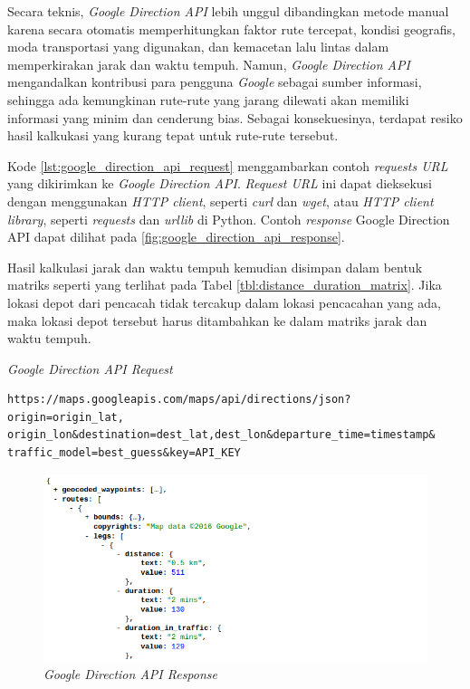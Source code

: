 Secara teknis, \textit{Google Direction API} lebih unggul dibandingkan metode manual karena secara otomatis memperhitungkan faktor rute tercepat, kondisi geografis, moda transportasi yang digunakan, dan kemacetan lalu lintas dalam memperkirakan jarak dan waktu tempuh. Namun, \textit{Google Direction API} mengandalkan kontribusi para pengguna \textit{Google} sebagai sumber informasi, sehingga ada kemungkinan rute-rute yang jarang dilewati akan memiliki informasi yang minim dan cenderung bias. Sebagai konsekuesinya, terdapat resiko hasil kalkukasi yang kurang tepat untuk rute-rute tersebut. 


Kode \ref{lst:google_direction_api_request} menggambarkan contoh \textit{requests URL} yang dikirimkan ke \textit{Google Direction API}. \textit{Request URL} ini dapat dieksekusi dengan menggunakan \textit{HTTP client}, seperti \textit{curl} dan \textit{wget}, atau \textit{HTTP client library}, seperti \textit{requests} dan \textit{urllib} di Python. Contoh \textit{response} Google Direction API dapat dilihat pada \autoref{fig:google_direction_api_response}.


Hasil kalkulasi jarak dan waktu tempuh kemudian disimpan dalam bentuk matriks seperti yang terlihat pada Tabel \ref{tbl:distance_duration_matrix}. Jika lokasi depot dari pencacah tidak tercakup dalam lokasi pencacahan yang ada, maka lokasi depot tersebut harus ditambahkan ke dalam matriks jarak dan waktu tempuh.


\begin{listing}[!]
	\caption{\textit{Google Direction API Request}}
	\label{lst:google_direction_api_request}
	\begin{verbatim}
https://maps.googleapis.com/maps/api/directions/json?origin=origin_lat,
origin_lon&destination=dest_lat,dest_lon&departure_time=timestamp&
traffic_model=best_guess&key=API_KEY
	\end{verbatim}
\end{listing}


\begin{figure}[!]
	\centering
	\includegraphics[width=\textwidth]{Resources/Images/google_direction_api_response}
	\caption{\textit{Google Direction API Response}}
	\label{fig:google_direction_api_response}
\end{figure}


